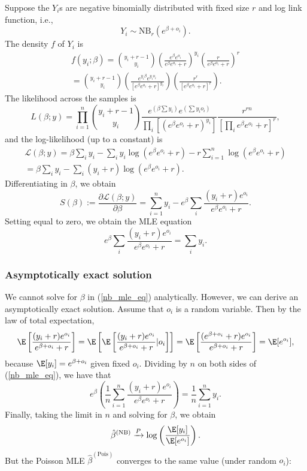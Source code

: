 \documentclass[12pt]{article}
\begin{document}
Suppose the $Y_i$s are negative binomially distributed with fixed size $ r$ and log link function, i.e.,
$$ Y_i \sim \textrm{NB}_r(e^{\beta + o_i}).$$ The density $f$ of $Y_i$ is
\begin{multline*}
f(y_i; \beta) = \binom{y_i + r - 1}{y_i} \left( \frac{ e^{\beta} e^{o_i} }{ e^{\beta}e^{o_i} + r } \right)^{y_i} \left( \frac{ r }{ e^{\beta}e^{o_i} + r } \right)^r \\ = \binom{y_i + r - 1}{y_i} \left( \frac{ e^{y_i\beta} e^{y_i o_i} }{ [e^\beta e^{o_i} + r]^{y_i} } \right) \left( \frac{r^r}{[e^{\beta} e^{o_i} + r ]^r} \right).
\end{multline*}
The likelihood across the samples is
$$ L(\beta; y) = \prod_{i=1}^n \binom{ y_i + r - 1 }{ y_i }  \frac{ e^{ (\beta \sum y_i)} e^{\left(\sum y_i o_i \right)} }{  \prod_{i} \left[ \left( e^\beta e^{o_i} + r \right)^{y_i} \right] } \frac{ r^{rn} }{ \left[ \prod_i e^{\beta} e^{o_i} + r \right]^r },$$ and the log-likelihood (up to a constant) is
 \begin{multline*} \mathcal{L}(\beta; y) = \beta \sum_i y_i - \sum_{i}  y_i \log\left( e^\beta e^{o_i} + r \right) - r \sum_{i=1}^n \log( e^{\beta} e^{o_i} + r ) \\ = \beta \sum_{i} y_i - \sum_{i} (y_i + r) \log ( e^\beta e^{o_i} + r ). \end{multline*} Differentiating in $\beta$, we obtain
 $$S(\beta) := \frac{\partial \mathcal{L}(\beta; y) }{ \partial \beta } = \sum_{i=1}^n  y_i - e^\beta \sum_{i} \frac{(y_i + r)e^{o_i}}{ e^\beta e^{o_i} + r}.$$ 
 Setting equal to zero, we obtain the MLE equation
 \begin{equation}\label{nb_mle_eq}
   e^\beta \sum_i \frac{ (y_i + r) e^{o_i} }{ e^\beta e^{o_i} + r  }  = \sum_i y_i. 
 \end{equation}
 
 \subsubsection{Asymptotically exact solution}
 
 We cannot solve for $\beta$ in (\ref{nb_mle_eq}) analytically. However, we can derive an asymptotically exact solution. Assume that $o_i$ is a random variable. Then by the law of total expectation,
 \begin{multline*} \E \left[ \frac{(y_i + r) e^{o_i}}{ e^{\beta + o_i} + r } \right] = \E \left[ \E\left[ \frac{ (y_i + r) e^{o_i} }{ e^{\beta + o_i} + r } | o_i\right] \right] = \E \left[ \frac{ (e^{\beta + o_i} + r) e^{o_i}}{ e^{\beta + o_i} + r } \right] = \E [ e^{o_i} ],
 \end{multline*} 
 because $\E[y_i] = e^{\beta + o_i}$ given fixed $o_i$. Dividing by $n$ on both sides of (\ref{nb_mle_eq}), we have that
 $$ e^{\beta} \left( \frac{1}{n} \sum_{i=1}^n \frac{ (y_i + r)e^{o_i} }{ e^\beta e^{o_i} + r } \right) = \frac{1}{n} \sum_{i=1}^n y_i.$$ Finally, taking the limit in $n$ and solving for $\beta$, we obtain
 \begin{equation}
\hat{\beta}^{(\textrm{NB})} \xrightarrow{P} \log\left( \frac{ \E[y_i] }{ \E[ e^{o_i} ] } \right).
 \end{equation}
 But the Poisson MLE $\hat{\beta}^{(\textrm{Pois})}$ converges to the same value (under random $o_i$):
 
\end{document}

